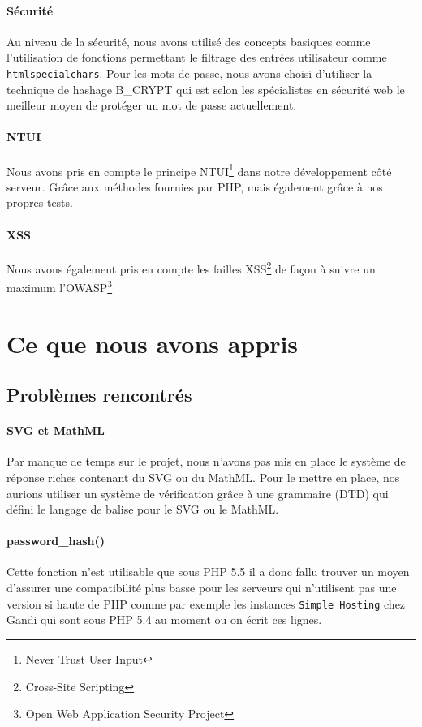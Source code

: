 \documentclass[12pt]{article}
\begin{document}
    \paragraph{Sécurité} Au niveau de la sécurité, nous avons utilisé des concepts basiques comme l'utilisation de fonctions permettant le filtrage des entrées utilisateur comme \texttt{htmlspecialchars}. Pour les mots de passe, nous avons choisi d'utiliser la technique de hashage B\_CRYPT qui est selon les spécialistes en sécurité web le meilleur moyen de protéger un mot de passe actuellement.
    
    \paragraph{NTUI} Nous avons pris en compte le principe NTUI\footnote{Never Trust User Input} dans notre développement côté serveur. Grâce aux méthodes fournies par PHP, mais également grâce à nos propres tests.
    
    \paragraph{XSS} Nous avons également pris en compte les failles XSS\footnote{Cross-Site Scripting} de façon à suivre un maximum l'OWASP\footnote{Open Web Application Security Project}

\section{Ce que nous avons appris}
    \subsection{Problèmes rencontrés}
        \paragraph{SVG et MathML}Par manque de temps sur le projet, nous n'avons pas mis en place le système de réponse riches contenant du SVG ou du MathML. Pour le mettre en place, nos aurions utiliser un système de vérification grâce à une grammaire (DTD) qui défini le langage de balise pour le SVG ou le MathML.
        \paragraph{password\_hash()}Cette fonction n'est utilisable que sous PHP 5.5 il a donc fallu trouver un moyen d'assurer une compatibilité plus basse pour les serveurs qui n'utilisent pas une version si haute de PHP comme par exemple les instances \texttt{Simple Hosting} chez Gandi qui sont sous PHP 5.4 au moment ou on écrit ces lignes.
        
\end{document}

